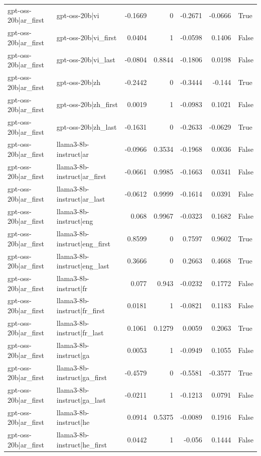 \begin{table}
\begin{tabular}{l l r r r r l}
gpt-oss-20b|ar_first & gpt-oss-20b|vi & -0.1669 & 0 & -0.2671 & -0.0666 & True \\
gpt-oss-20b|ar_first & gpt-oss-20b|vi_first & 0.0404 & 1 & -0.0598 & 0.1406 & False \\
gpt-oss-20b|ar_first & gpt-oss-20b|vi_last & -0.0804 & 0.8844 & -0.1806 & 0.0198 & False \\
gpt-oss-20b|ar_first & gpt-oss-20b|zh & -0.2442 & 0 & -0.3444 & -0.144 & True \\
gpt-oss-20b|ar_first & gpt-oss-20b|zh_first & 0.0019 & 1 & -0.0983 & 0.1021 & False \\
gpt-oss-20b|ar_first & gpt-oss-20b|zh_last & -0.1631 & 0 & -0.2633 & -0.0629 & True \\
gpt-oss-20b|ar_first & llama3-8b-instruct|ar & -0.0966 & 0.3534 & -0.1968 & 0.0036 & False \\
gpt-oss-20b|ar_first & llama3-8b-instruct|ar_first & -0.0661 & 0.9985 & -0.1663 & 0.0341 & False \\
gpt-oss-20b|ar_first & llama3-8b-instruct|ar_last & -0.0612 & 0.9999 & -0.1614 & 0.0391 & False \\
gpt-oss-20b|ar_first & llama3-8b-instruct|eng & 0.068 & 0.9967 & -0.0323 & 0.1682 & False \\
gpt-oss-20b|ar_first & llama3-8b-instruct|eng_first & 0.8599 & 0 & 0.7597 & 0.9602 & True \\
gpt-oss-20b|ar_first & llama3-8b-instruct|eng_last & 0.3666 & 0 & 0.2663 & 0.4668 & True \\
gpt-oss-20b|ar_first & llama3-8b-instruct|fr & 0.077 & 0.943 & -0.0232 & 0.1772 & False \\
gpt-oss-20b|ar_first & llama3-8b-instruct|fr_first & 0.0181 & 1 & -0.0821 & 0.1183 & False \\
gpt-oss-20b|ar_first & llama3-8b-instruct|fr_last & 0.1061 & 0.1279 & 0.0059 & 0.2063 & True \\
gpt-oss-20b|ar_first & llama3-8b-instruct|ga & 0.0053 & 1 & -0.0949 & 0.1055 & False \\
gpt-oss-20b|ar_first & llama3-8b-instruct|ga_first & -0.4579 & 0 & -0.5581 & -0.3577 & True \\
gpt-oss-20b|ar_first & llama3-8b-instruct|ga_last & -0.0211 & 1 & -0.1213 & 0.0791 & False \\
gpt-oss-20b|ar_first & llama3-8b-instruct|he & 0.0914 & 0.5375 & -0.0089 & 0.1916 & False \\
gpt-oss-20b|ar_first & llama3-8b-instruct|he_first & 0.0442 & 1 & -0.056 & 0.1444 & False \\

\end{tabular}
\end{table}
